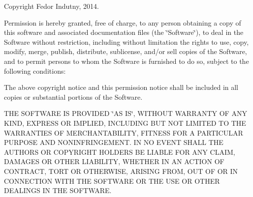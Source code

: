 Copyright Fedor Indutny, 2014.

Permission is hereby granted, free of charge, to any person obtaining a copy of this software and associated documentation files (the \char`\"{}\+Software\char`\"{}), to deal in the Software without restriction, including without limitation the rights to use, copy, modify, merge, publish, distribute, sublicense, and/or sell copies of the Software, and to permit persons to whom the Software is furnished to do so, subject to the following conditions\+:

The above copyright notice and this permission notice shall be included in all copies or substantial portions of the Software.

T\+HE S\+O\+F\+T\+W\+A\+RE IS P\+R\+O\+V\+I\+D\+ED \char`\"{}\+A\+S I\+S\char`\"{}, W\+I\+T\+H\+O\+UT W\+A\+R\+R\+A\+N\+TY OF A\+NY K\+I\+ND, E\+X\+P\+R\+E\+SS OR I\+M\+P\+L\+I\+ED, I\+N\+C\+L\+U\+D\+I\+NG B\+UT N\+OT L\+I\+M\+I\+T\+ED TO T\+HE W\+A\+R\+R\+A\+N\+T\+I\+ES OF M\+E\+R\+C\+H\+A\+N\+T\+A\+B\+I\+L\+I\+TY, F\+I\+T\+N\+E\+SS F\+OR A P\+A\+R\+T\+I\+C\+U\+L\+AR P\+U\+R\+P\+O\+SE A\+ND N\+O\+N\+I\+N\+F\+R\+I\+N\+G\+E\+M\+E\+NT. IN NO E\+V\+E\+NT S\+H\+A\+LL T\+HE A\+U\+T\+H\+O\+RS OR C\+O\+P\+Y\+R\+I\+G\+HT H\+O\+L\+D\+E\+RS BE L\+I\+A\+B\+LE F\+OR A\+NY C\+L\+A\+IM, D\+A\+M\+A\+G\+ES OR O\+T\+H\+ER L\+I\+A\+B\+I\+L\+I\+TY, W\+H\+E\+T\+H\+ER IN AN A\+C\+T\+I\+ON OF C\+O\+N\+T\+R\+A\+CT, T\+O\+RT OR O\+T\+H\+E\+R\+W\+I\+SE, A\+R\+I\+S\+I\+NG F\+R\+OM, O\+UT OF OR IN C\+O\+N\+N\+E\+C\+T\+I\+ON W\+I\+TH T\+HE S\+O\+F\+T\+W\+A\+RE OR T\+HE U\+SE OR O\+T\+H\+ER D\+E\+A\+L\+I\+N\+GS IN T\+HE S\+O\+F\+T\+W\+A\+RE. 